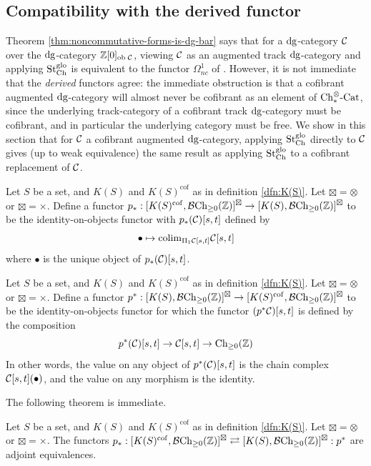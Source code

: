 \documentclass[12pt]{amsart}
\newcommand{\cof}{\mathrm{cof}}
\begin{document}
\subsection{Compatibility with the derived functor}
Theorem \ref{thm:noncommutative-forms-is-dg-bar} says that for a $\mathrm{dg}$-category $\mathcal{C}$ over the $\mathrm{dg}$-category $\mathbb{Z}[0]_{{\mathrm{ob}\;} \mathcal{C}}$, viewing $\mathcal{C}$ as an augmented track $\mathrm{dg}$-category and applying ${\mathrm{St}^{\mathrm{glo}}_\mathrm{Ch}}$ is equivalent to the functor $\Omega^1_{nc}$ of \cite{Tabuada2009}. 
However, it is not immediate that the \textit{derived} functors agree: 
the immediate obstruction is that a cofibrant augmented $\mathrm{dg}$-category will almost never be cofibrant as an element of ${\mathrm{Ch}_{*}^{\otimes}\text{-}\mathrm{Cat}}$, since the underlying track-category of a cofibrant track $\mathrm{dg}$-category must be cofibrant, and in particular the underlying category must be free. 
We show in this section that for $\mathcal{C}$ a cofibrant augmented $\mathrm{dg}$-category, applying ${\mathrm{St}^{\mathrm{glo}}_\mathrm{Ch}}$ directly to $\mathcal{C}$ gives (up to weak equivalence) the same result as applying ${\mathrm{St}^{\mathrm{glo}}_\mathrm{Ch}}$ to a cofibrant replacement of $\mathcal{C}$.
\begin{definition}\label{dfn:pushforward-functor}
	Let $S$ be a set, and $K(S)$ and $K(S)^\cof$ as in definition \ref{dfn:K(S)}. Let $\boxtimes = \otimes$ or $\boxtimes = \times$.
	Define a functor $p_*: [K(S)^\cof, \bchbasic]^\boxtimes \to [K(S), \bchbasic]^\boxtimes$ to be the identity-on-objects functor with $p_*(\mathcal{C})[s,t]$ defined by
	$$\bullet \mapsto \mathrm{colim}_{\Pi_1\mathcal{C}[s,t]}\mathcal{C}[s,t]$$
	where $\bullet$ is the unique object of $p_*(\mathcal{C})[s,t]$.
\end{definition}

\begin{definition}\label{dfn:pullback-functor}
	Let $S$ be a set, and $K(S)$ and $K(S)^\cof$ as in definition \ref{dfn:K(S)}. Let $\boxtimes = \otimes$ or $\boxtimes = \times$.
	Define a functor $p^*: [K(S), \bchbasic]^\boxtimes \to [K(S)^\cof, \bchbasic]^\boxtimes$ to be the identity-on-objects functor for which the functor $(p^* \mathcal{C})[s,t]$ is defined by the composition
	$$p^*(\mathcal{C})[s,t] \to \mathcal{C}[s,t] \to \mathrm{Ch}_{\ge 0}(\mathbb{Z})$$
	In other words, the value on any object of $p^*(\mathcal{C})[s,t]$ is the chain complex $\mathcal{C}[s,t](\bullet)$, and the value on any morphism is the identity.  
\end{definition}
The following theorem is immediate.
\begin{theorem}	
	Let $S$ be a set, and $K(S)$ and $K(S)^\cof$ as in definition \ref{dfn:K(S)}. Let $\boxtimes = \otimes$ or $\boxtimes = \times$. The functors $p_* :  [K(S)^\cof, \bchbasic]^\boxtimes \rightleftarrows [K(S), \bchbasic]^\boxtimes : p^*$ are adjoint equivalences.
\end{theorem}
\end{document}
